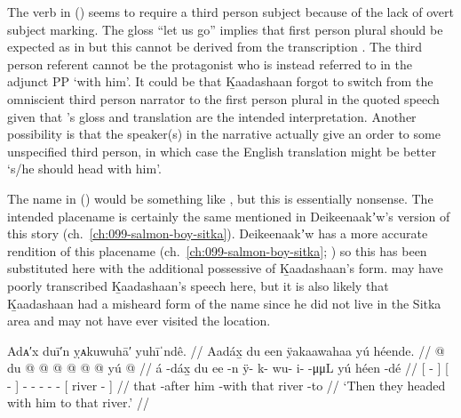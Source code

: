 The verb  in (\lastx) seems to require a third person subject because of the lack of overt subject marking.
The gloss “let us go” implies that first person plural  should be expected as in  but this cannot be derived from the transcription .
The third person referent cannot be the protagonist who is instead referred to in the adjunct PP  ‘with him’.
It could be that Ḵaadashaan forgot to switch from the omniscient third person narrator to the first person plural in the quoted speech given that \citeauthor{swanton:1909}’s gloss and translation are the intended interpretation.
Another possibility is that the speaker(s) in the narrative actually give an order to some unspecified third person, in which case the English translation might be better ‘s/he should head with him’.

The name  in (\lastx) would be something like , but this is essentially nonsense.
The intended placename is certainly the same   mentioned in Deikeenaakʼw’s version of this story (ch.\ \ref{ch:099-salmon-boy-sitka}).
Deikeenaakʼw has a more accurate rendition  of this placename (ch.\ \ref{ch:099-salmon-boy-sitka}; \cite[cf.][97 \#288]{thornton:2012}) so this has been substituted here with the additional possessive  of Ḵaadashaan’s form.
\citeauthor{swanton:1909} may have poorly transcribed Ḵaadashaan’s speech here, but it is also likely that Ḵaadashaan had a misheard form of the name since he did not live in the Sitka area and may not have ever visited the location.

\ex\label{ex:100-46-headed-there}%
%
\begingl
	\glpreamble	Adᴀ′x duī′n ỵᴀkuwuhā′ yuhīˈndê. //
	\glpreamble	Aadáx̱ du een ÿakaawahaa yú héende. //
	\gla	{}  @ {} {}
		{} du  @ {} {}
		 @ {} @ {} @ {} @ {} @ {}
		{} yú  @ {} {} //
	\glb	{} á -dáx̱ {}
		{} du ee -n {}
		ÿ- k- wu- i-  -μμL
		{} yú héen -dé {} //
	\glc	{}[  - {}]
		{}[   - {}]
		\xx{qual}- - - -  -
		{}[  river - {}] //
	\gld	{} that -after {}
		{} him {} -with {}
		 {} {} {} {} {}
		{} that river -to {} //
	\glft	‘Then they headed with him to that river.’
		//
\endgl
\xe

